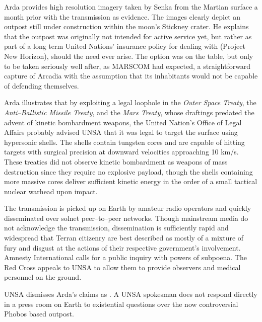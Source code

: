 Arda provides high resolution imagery taken by Senka from the Martian surface a month prior with the transmission as evidence. The images clearly depict an outpost still under construction within the moon's Stickney crater. He explains that the outpost was originally not intended for active service yet, but rather as part of a long term United Nations' insurance policy for dealing with  (Project New Horizon), should the need ever arise. The option was on the table, but only to be taken seriously well after, as MARSCOM had expected, a straightforward capture of Arcadia with the assumption that its inhabitants would not be capable of defending themselves.

Arda illustrates that by exploiting a legal loophole in the {\it Outer Space Treaty}, the {\it Anti--Ballistic Missile Treaty}, and the {\it Mars Treaty}, whose draftings predated the advent of kinetic bombardment weapons, the United Nation's Office of Legal Affairs probably advised UNSA that it was legal to target the surface using hypersonic shells. The shells contain tungsten cores and are capable of hitting targets with surgical precision at downward velocities approaching 10 km/s. These treaties did not observe kinetic bombardment as weapons of mass destruction since they require no explosive payload, though the shells containing more massive cores deliver sufficient kinetic energy in the order of a small tactical nuclear warhead upon impact.

The transmission is picked up on Earth by amateur radio operators and quickly disseminated over solnet peer--to--peer networks. Though mainstream media do not acknowledge the transmission, dissemination is sufficiently rapid and widespread that Terran citizenry are best described as mostly of a mixture of fury and disgust at the actions of their respective government's involvement. Amnesty International calls for a public inquiry with powers of subpoena. The Red Cross appeals to UNSA to allow them to provide observers and medical personnel on the ground.

UNSA dismisses Arda's claims as . A UNSA spokesman does not respond directly in a press room on Earth to existential questions over the now controversial Phobos based outpost. 

